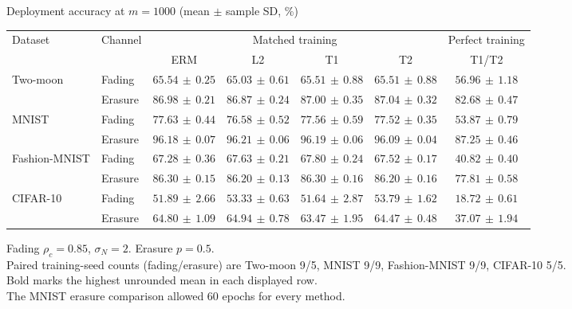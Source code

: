 \documentclass[border=4pt]{standalone}
\begin{document}
\begin{minipage}{7.8in}
\centering
Deployment accuracy at $m=1000$ (mean $\pm$ sample SD, \%)\\[4pt]
\begin{tabular*}{\linewidth}{@{\extracolsep{\fill}}llccccc@{}}
\toprule
\multirow{2}{*}{Dataset} & \multirow{2}{*}{Channel} & \multicolumn{4}{c}{Matched training} & Perfect training \\
\cmidrule(lr){3-6}\cmidrule(l){7-7}
 & & ERM & L2 & T1 & T2 & T1/T2 \\
\midrule
\multirow{2}{*}{Two-moon} & Fading & $\mathbf{65.54}\,\pm\,0.25$ & $65.03\,\pm\,0.61$ & $65.51\,\pm\,0.88$ & $65.51\,\pm\,0.88$ & $56.96\,\pm\,1.18$ \\
 & Erasure & $86.98\,\pm\,0.21$ & $86.87\,\pm\,0.24$ & $87.00\,\pm\,0.35$ & $\mathbf{87.04}\,\pm\,0.32$ & $82.68\,\pm\,0.47$ \\
\midrule[0.25pt]
\multirow{2}{*}{MNIST} & Fading & $\mathbf{77.63}\,\pm\,0.44$ & $76.58\,\pm\,0.52$ & $77.56\,\pm\,0.59$ & $77.52\,\pm\,0.35$ & $53.87\,\pm\,0.79$ \\
 & Erasure & $96.18\,\pm\,0.07$ & $\mathbf{96.21}\,\pm\,0.06$ & $96.19\,\pm\,0.06$ & $96.09\,\pm\,0.04$ & $87.25\,\pm\,0.46$ \\
\midrule[0.25pt]
\multirow{2}{*}{Fashion-MNIST} & Fading & $67.28\,\pm\,0.36$ & $67.63\,\pm\,0.21$ & $\mathbf{67.80}\,\pm\,0.24$ & $67.52\,\pm\,0.17$ & $40.82\,\pm\,0.40$ \\
 & Erasure & $\mathbf{86.30}\,\pm\,0.15$ & $86.20\,\pm\,0.13$ & $86.30\,\pm\,0.16$ & $86.20\,\pm\,0.16$ & $77.81\,\pm\,0.58$ \\
\midrule[0.25pt]
\multirow{2}{*}{CIFAR-10} & Fading & $51.89\,\pm\,2.66$ & $53.33\,\pm\,0.63$ & $51.64\,\pm\,2.87$ & $\mathbf{53.79}\,\pm\,1.62$ & $18.72\,\pm\,0.61$ \\
 & Erasure & $64.80\,\pm\,1.09$ & $\mathbf{64.94}\,\pm\,0.78$ & $63.47\,\pm\,1.95$ & $64.47\,\pm\,0.48$ & $37.07\,\pm\,1.94$ \\
\bottomrule
\end{tabular*}
\par\smallskip\raggedright\footnotesize
Fading $\rho_c=0.85$, $\sigma_N=2$. Erasure $p=0.5$.\\
Paired training-seed counts (fading/erasure) are Two-moon 9/5, MNIST 9/9, Fashion-MNIST 9/9, CIFAR-10 5/5.\\
Bold marks the highest unrounded mean in each displayed row.\\
The MNIST erasure comparison allowed 60 epochs for every method.
\end{minipage}
\end{document}

